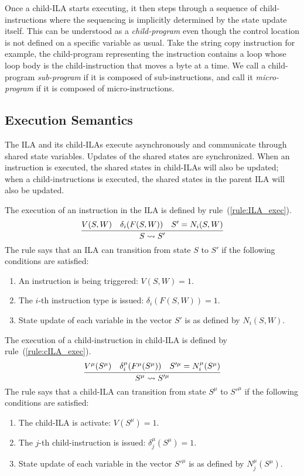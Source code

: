 Once a child-ILA starts executing, it then steps through a sequence of 
child-instructions where the sequencing is implicitly determined by the state
update itself.
This can be understood as a \textit{child-program} even though the control 
location is not defined on a specific variable as usual.
%
Take the string copy instruction for example, the child-program representing 
the instruction contains a loop whose loop body is the child-instruction that 
moves a byte at a time.
% 
We call a child-program \textit{sub-program} if it is composed of 
sub-instructions, and call it \textit{micro-program} if it is composed of 
micro-instructions. 

\subsection*{Execution Semantics}
The ILA and its child-ILAs execute asynchronously and communicate through shared
state variables. 
Updates of the shared states are synchronized.
When an instruction is executed, the shared states in child-ILAs will also be 
updated; when a child-instructions is executed, the shared states in the parent
ILA will also be updated.

The execution of an instruction in the ILA is defined by 
rule~(\ref{rule:ILA_exec}).
%
\begin{equation}
  \infer{S \rightsquigarrow S'}
        {V(S, W) & \delta_i(F(S, W)) & S' = N_i(S, W)}
  \label{rule:ILA_exec}
\end{equation}
%
The rule says that an ILA can transition from state $S$ to $S'$ if the following 
conditions are satisfied:
\begin{enumerate}
  \item An instruction is being triggered: $V(S, W) = 1$.
  \item The $i$-th instruction type is issued: $\delta_i(F(S, W)) = 1$.
  \item State update of each variable in the vector $S'$ is as defined by 
        $N_i (S, W)$.
\end{enumerate}

The execution of a child-instruction in child-ILA is defined by 
rule~(\ref{rule:cILA_exec}).
\begin{equation}
  \infer{S^\mu \rightsquigarrow S'^\mu}
        {V^\mu(S^\mu) & \delta_i^\mu(F^\mu(S^\mu)) & S'^\mu = N_i^\mu(S^\mu)}
  \label{rule:cILA_exec}
\end{equation}
The rule says that a child-ILA can transition from state $S^\mu$ to $S'^\mu$ if 
the following conditions are satisfied:
\begin{enumerate}
  \item The child-ILA is activate: $V(S^\mu) = 1$.
  \item The $j$-th child-instruction is issued: $\delta_j^\mu(S^\mu) = 1$.
  \item State update of each variable in the vector $S'^\mu$ is as defined by 
        $N_j^\mu (S^\mu)$.
\end{enumerate}

